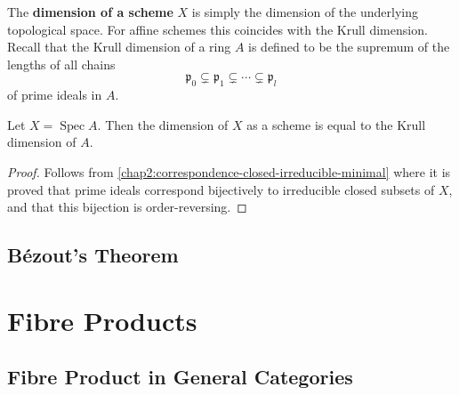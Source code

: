 \documentclass[12pt]{book}
\newcommand{\inlinedef}[1]{\textcolor{oxfordblue}{\bfseries #1}}
\theoremstyle{definition}
\DeclareMathOperator{\Spec}{Spec}
\begin{document}
	The \inlinedef{dimension of a scheme} $X$ is simply the dimension of the underlying topological space. For affine schemes this coincides with the Krull dimension. Recall that the Krull dimension of a ring $A$ is defined to be the supremum of the lengths of all chains
	\begin{equation*}
		\mathfrak{p}_0 \subsetneq \mathfrak{p}_1 \subsetneq \dotsb \subsetneq\mathfrak{p}_{l}
	\end{equation*}
	of prime ideals in $A$.
	
	\begin{proposition}
		Let $X = \Spec A$. Then the dimension of $X$ as a scheme is equal to the Krull dimension of $A$.
	\end{proposition}
	\begin{proof}
		Follows from \cref{chap2:correspondence-closed-irreducible-minimal} where it is proved that prime ideals correspond bijectively to irreducible closed subsets of $X$, and that this bijection is order-reversing.
	\end{proof}
	
	\section{Bézout's Theorem}
	
	
	\chapter{Fibre Products}
	
	\section{Fibre Product in General Categories}
	
\end{document}
